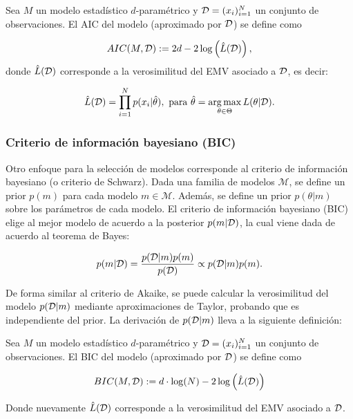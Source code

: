\begin{definition}[AIC]
	Sea $M$ un modelo estadístico $d$-paramétrico y ${\mathcal D}=(x_i)_{i=1}^N$ un conjunto de observaciones. El AIC del modelo (aproximado por ${\mathcal D}$) se define como
	
	\begin{equation}
		AIC(M,{\mathcal D}):=2d-2\log\left(\hat{L}({\mathcal D})\right),
	\end{equation}
donde $\hat{L}({\mathcal D})$ corresponde a la verosimilitud del EMV asociado a ${\mathcal D}$, es decir:
	
	\begin{equation}
		\hat{L}({\mathcal D}) = \prod_{i=1}^N p(x_i|\hat{\theta}),\text{ para } \hat{\theta} = \operatorname*{arg\,max}_{\theta\in\Theta} L(\theta|{\mathcal D}).
	\end{equation}
\end{definition}

\subsubsection{Criterio de información bayesiano (BIC)}

Otro enfoque para la selección de modelos corresponde al criterio de información bayesiano (o criterio de Schwarz). Dada una familia de modelos $\mathcal{M}$, se define un prior $p(m)$ para cada modelo $m\in\mathcal{M}$. Además, se define un prior $p(\theta|m)$ sobre los parámetros de cada modelo. El criterio de información bayesiano (BIC) elige al mejor modelo de acuerdo a la posterior $p(m|{\mathcal D})$, la cual viene dada de acuerdo al teorema de Bayes:

\begin{equation}
	p(m|{\mathcal D})=\frac{p({\mathcal D}|m)p(m)}{p({\mathcal D})}\propto p({\mathcal D}|m)p(m).
\end{equation}

De forma similar al criterio de Akaike, se puede calcular la verosimilitud del modelo $p({\mathcal D}|m)$ mediante aproximaciones de Taylor, probando que es independiente del prior. La derivación de $p({\mathcal D}|m)$ lleva a la siguiente definición:

\begin{definition}[BIC]
	Sea $M$ un modelo estadístico $d$-paramétrico y ${\mathcal D}=(x_i)_{i=1}^N$ un conjunto de observaciones. El BIC del modelo (aproximado por ${\mathcal D}$) se define como
	
	\begin{equation}
		BIC(M,{\mathcal D}):= d\cdot\log(N) - 2\log\left(\hat{L}({\mathcal D})\right)
	\end{equation}
	
	Donde nuevamente $\hat{L}({\mathcal D})$ corresponde a la verosimilitud del EMV asociado a ${\mathcal D}$.
\end{definition}

